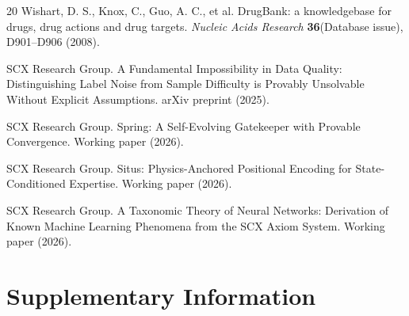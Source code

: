 \documentclass[12pt,a4paper]{article}
\begin{document}
\begin{thebibliography}{20}
 Wishart, D. S., Knox, C., Guo, A. C., et al. DrugBank: a knowledgebase for drugs, drug actions and drug targets. \textit{Nucleic Acids Research} \textbf{36}(Database issue), D901--D906 (2008).

 SCX Research Group. A Fundamental Impossibility in Data Quality: Distinguishing Label Noise from Sample Difficulty is Provably Unsolvable Without Explicit Assumptions. arXiv preprint (2025).

 SCX Research Group. Spring: A Self-Evolving Gatekeeper with Provable Convergence. Working paper (2026).

 SCX Research Group. Situs: Physics-Anchored Positional Encoding for State-Conditioned Expertise. Working paper (2026).

 SCX Research Group. A Taxonomic Theory of Neural Networks: Derivation of Known Machine Learning Phenomena from the SCX Axiom System. Working paper (2026).

\end{thebibliography}

\section{Supplementary Information}








\end{document}
